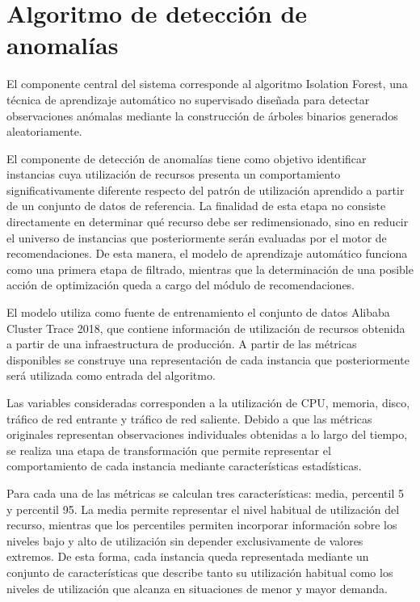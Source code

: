 \section{Algoritmo de detección de anomalías}

El componente central del sistema corresponde al algoritmo Isolation
Forest, una técnica de aprendizaje automático no supervisado diseñada
para detectar observaciones anómalas mediante la construcción de árboles
binarios generados aleatoriamente.

El componente de detección de anomalías tiene como objetivo identificar
instancias cuya utilización de recursos presenta un comportamiento
significativamente diferente respecto del patrón de utilización
aprendido a partir de un conjunto de datos de referencia. La finalidad
de esta etapa no consiste directamente en determinar qué recurso debe
ser redimensionado, sino en reducir el universo de instancias que
posteriormente serán evaluadas por el motor de recomendaciones. De esta
manera, el modelo de aprendizaje automático funciona como una primera
etapa de filtrado, mientras que la determinación de una posible acción
de optimización queda a cargo del módulo de recomendaciones.

El modelo utiliza como fuente de entrenamiento el conjunto de datos
Alibaba Cluster Trace 2018, que contiene información de utilización de
recursos obtenida a partir de una infraestructura de producción. A
partir de las métricas disponibles se construye una representación de
cada instancia que posteriormente será utilizada como entrada del
algoritmo.

Las variables consideradas corresponden a la utilización de CPU,
memoria, disco, tráfico de red entrante y tráfico de red saliente.
Debido a que las métricas originales representan observaciones
individuales obtenidas a lo largo del tiempo, se realiza una etapa de
transformación que permite representar el comportamiento de cada
instancia mediante características estadísticas.

Para cada una de las métricas se calculan tres características: media,
percentil 5 y percentil 95. La media permite representar el nivel
habitual de utilización del recurso, mientras que los percentiles
permiten incorporar información sobre los niveles bajo y alto de
utilización sin depender exclusivamente de valores extremos. De esta
forma, cada instancia queda representada mediante un conjunto de
características que describe tanto su utilización habitual como los
niveles de utilización que alcanza en situaciones de menor y mayor
demanda.

